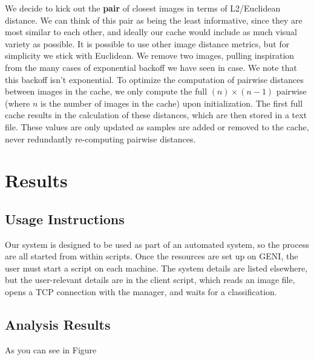 \documentclass[12pt]{article}
\begin{document}
We decide to kick out the \textbf{pair} of closest images in terms of L2/Euclidean distance. We can think of this pair as being the least informative, since they are most similar to each other, and ideally our cache would include as much visual variety as possible. It is possible to use other image distance metrics, but for simplicity we stick with Euclidean. We remove two images, pulling inspiration from the many cases of exponential backoff we have seen in case. We note that this backoff isn't exponential. To optimize the computation of pairwise distances between images in the cache, we only compute the full $(n) \times (n-1)$ pairwise (where $n$ is the number of images in the cache) upon initialization. The first full cache results in the calculation of these distances, which are then stored in a text file. These values are only updated as samples are added or removed to the cache, never redundantly re-computing pairwise distances.

\section{Results}

\subsection{Usage Instructions}

Our system is designed to be used as part of an automated system, so the process are all started from within scripts.
Once the resources are set up on GENI, the user must start a script on each machine.
The system details are listed elsewhere, but the user-relevant details are in the client script, which reads an image file, opens a TCP connection with the manager, and waits for a classification.

\subsection{Analysis Results}

As you can see in Figure 
\end{document}
